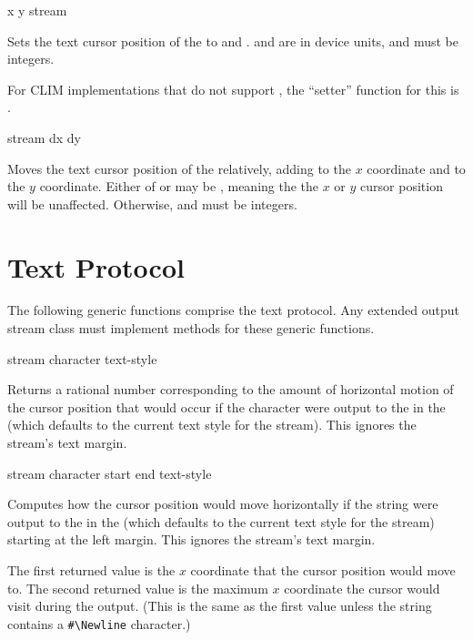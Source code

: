  {x y stream}

Sets the text cursor position of the  
to  and .   and  are in device units, and must be
integers.

For CLIM implementations that do not support , the ``setter'' function
for this is .

 {stream dx dy}

Moves the text cursor position of the  
relatively, adding  to the $x$ coordinate and  to the $y$
coordinate.  Either of  or  may be , meaning the the $x$
or $y$ cursor position will be unaffected.  Otherwise,  and 
must be integers.


\section {Text Protocol}

The following generic functions comprise the text protocol.  Any extended output
stream class must implement methods for these generic functions.

 {stream character \key text-style}

Returns a rational number corresponding to the amount of horizontal motion of
the cursor position that would occur if the character  were
output to the   in the   (which defaults to the current text style for the
stream).  This ignores the stream's text margin.

 {stream character \key start end text-style}

Computes how the cursor position would move horizontally if the string
 were output to the   in
the   (which defaults to the current text style
for the stream) starting at the left margin.  This ignores the stream's text
margin.

The first returned value is the $x$ coordinate that the cursor position would
move to.  The second returned value is the maximum $x$ coordinate the cursor
would visit during the output. (This is the same as the first value unless the
string contains a \verb+#\Newline+ character.)

